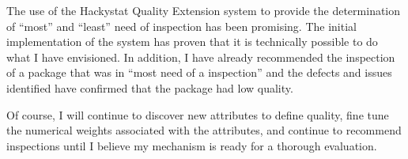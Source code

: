
The use of the Hackystat Quality Extension system to provide the
determination of ``most'' and ``least'' need of inspection has been promising.
The initial implementation of the system has proven that it is technically
possible to do what I have envisioned. In addition, I have already
recommended the inspection of a package that was in ``most need of a inspection''
and the defects and issues identified have confirmed that the package had
low quality.

Of course, I will continue to discover new attributes to define quality,
fine tune the numerical weights associated with the attributes, and
continue to recommend inspections until I believe my mechanism is ready for a
thorough evaluation.






